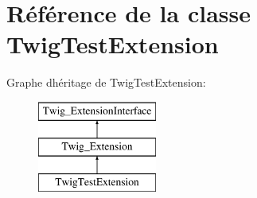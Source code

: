 \hypertarget{class_twig_test_extension}{}\section{Référence de la classe Twig\+Test\+Extension}
\label{class_twig_test_extension}
Graphe d\textquotesingle{}héritage de Twig\+Test\+Extension\+:\begin{figure}[H]
\begin{center}
\leavevmode
\includegraphics[height=3.000000cm]{class_twig_test_extension}
\end{center}
\end{figure}
